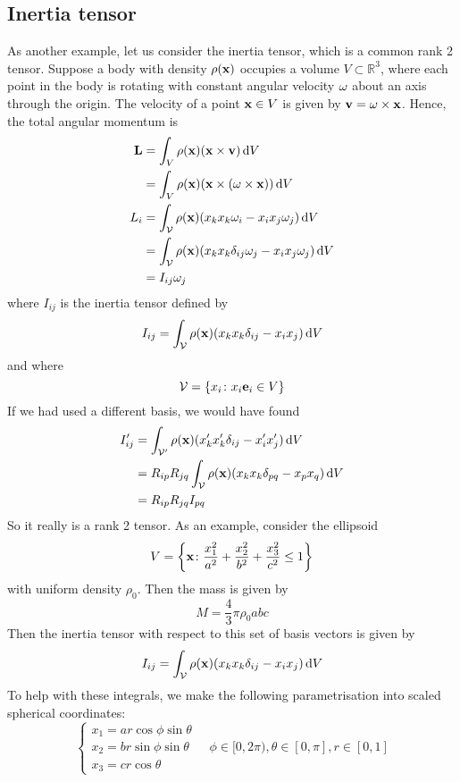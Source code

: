 \subsection{Inertia tensor}
As another example, let us consider the inertia tensor, which is a common rank 2 tensor.
Suppose a body with density \(\rho(\vb x)\) occupies a volume \(V \subset \mathbb R^3\), where each point in the body is rotating with constant angular velocity \(\vb\omega\) about an axis through the origin.
The velocity of a point \(\vb x \in V\) is given by \(\vb v = \vb \omega \times \vb x\).
Hence, the total angular momentum is
\begin{align*}
	\vb L & = \int_V \rho(\vb x) (\vb x \times \vb v) \dd{V}                                         \\
	      & = \int_V \rho(\vb x) (\vb x \times (\vb \omega \times \vb x)) \dd{V}                     \\
	L_i   & = \int_{\mathcal V} \rho(\vb x) (x_k x_k \omega_i - x_i x_j \omega_j) \dd{V}             \\
	      & = \int_{\mathcal V} \rho(\vb x) (x_k x_k \delta_{ij} \omega_j - x_i x_j \omega_j) \dd{V} \\
	      & = I_{ij}\omega_j
\end{align*}
where \(I_{ij}\) is the inertia tensor defined by
\[
	I_{ij} = \int_{\mathcal V} \rho(\vb x) (x_k x_k \delta_{ij} - x_i x_j) \dd{V}
\]
and where
\[
	\mathcal V = \qty{ x_i \colon x_i \vb e_i \in V }
\]
If we had used a different basis, we would have found
\begin{align*}
	I_{ij}' & = \int_{\mathcal V'} \rho(\vb x) (x_k' x_k' \delta_{ij} - x_i' x_j') \dd{V}          \\
	        & = R_{ip} R_{jq} \int_{\mathcal V} \rho(\vb x) (x_k x_k \delta_{pq} - x_p x_q) \dd{V} \\
	        & = R_{ip} R_{jq} I_{pq}
\end{align*}
So it really is a rank 2 tensor.
As an example, consider the ellipsoid
\[
	V = \qty{ \vb x \colon \frac{x_1^2}{a^2} + \frac{x_2^2}{b^2} + \frac{x_3^2}{c^2} \leq 1 }
\]
with uniform density \(\rho_0\).
Then the mass is given by
\[
	M = \frac{4}{3}\pi \rho_0 abc
\]
Then the inertia tensor with respect to this set of basis vectors is given by
\[
	I_{ij} = \int_{\mathcal V} \rho(\vb x) (x_k x_k \delta_{ij} - x_i x_j) \dd{V}
\]
To help with these integrals, we make the following parametrisation into scaled spherical coordinates:
\[
	\left\{ \begin{array}{l}
		x_1 = ar\cos\phi\sin\theta \\
		x_2 = br\sin\phi\sin\theta \\
		x_3 = cr\cos\theta
	\end{array} \right.\quad \phi\in[0, 2\pi),\theta\in[0, \pi], r \in[0, 1]
\]
